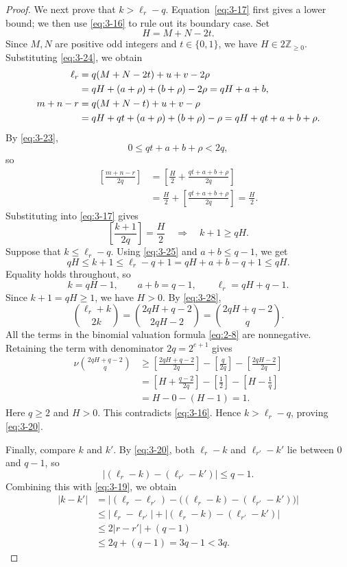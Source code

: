 \documentclass[11pt,a4paper]{article}
\numberwithin{equation}{section}
\theoremstyle{definition}
\begin{document}
\begin{proof}
We next prove that $k>\ell_r-q$. Equation~\eqref{eq:3-17} first gives a lower bound; we then use \eqref{eq:3-16} to rule out its boundary case. Set
\[
H=M+N-2t.
\]
Since $M,N$ are positive odd integers and $t\in\{0,1\}$, we have $H\in2\mathbb Z_{\ge0}$. Substituting \eqref{eq:3-24}, we obtain
\begin{align}
\ell_r&=q(M+N-2t)+u+v-2\rho\notag\\
&=qH+(a+\rho)+(b+\rho)-2\rho=qH+a+b,
\label{eq:3-25}\\
m+n-r&=q(M+N-t)+u+v-\rho\notag\\
&=qH+qt+(a+\rho)+(b+\rho)-\rho=qH+qt+a+b+\rho.
\label{eq:3-26}
\end{align}
By \eqref{eq:3-23},
\[
0\le qt+a+b+\rho<2q,
\]
so
\[
\begin{aligned}
\left[\frac{m+n-r}{2q}\right]
&=\left[\frac H2+\frac{qt+a+b+\rho}{2q}\right]\\
&=\frac H2+\left[\frac{qt+a+b+\rho}{2q}\right]=\frac H2.
\end{aligned}
\]
Substituting into \eqref{eq:3-17} gives
\begin{equation}
\left[\frac{k+1}{2q}\right]=\frac H2
\quad\Longrightarrow\quad k+1\ge qH.
\label{eq:3-27}
\end{equation}
Suppose that $k\le\ell_r-q$. Using \eqref{eq:3-25} and $a+b\le q-1$, we get
\[
qH\le k+1\le\ell_r-q+1=qH+a+b-q+1\le qH.
\]
Equality holds throughout, so
\begin{equation}
k=qH-1,\qquad a+b=q-1,\qquad\ell_r=qH+q-1.
\label{eq:3-28}
\end{equation}
Since $k+1=qH\ge1$, we have $H>0$. By \eqref{eq:3-28},
\begin{equation}
\binom{\ell_r+k}{2k}
=\binom{2qH+q-2}{2qH-2}
=\binom{2qH+q-2}{q}.
\label{eq:3-29}
\end{equation}
All the terms in the binomial valuation formula \eqref{eq:2-8} are nonnegative. Retaining the term with denominator $2q=2^{e+1}$ gives
\[
\begin{aligned}
\nu\binom{2qH+q-2}{q}
&\ge\left[\frac{2qH+q-2}{2q}\right]
-\left[\frac q{2q}\right]-\left[\frac{2qH-2}{2q}\right]\\
&=\left[H+\frac{q-2}{2q}\right]-\left[\frac12\right]-\left[H-\frac1q\right]\\
&=H-0-(H-1)=1.
\end{aligned}
\]
Here $q\ge2$ and $H>0$. This contradicts \eqref{eq:3-16}. Hence $k>\ell_r-q$, proving \eqref{eq:3-20}.

Finally, compare $k$ and $k'$. By \eqref{eq:3-20}, both $\ell_r-k$ and $\ell_{r'}-k'$ lie between $0$ and $q-1$, so
\[
\bigl|(\ell_r-k)-(\ell_{r'}-k')\bigr|\le q-1.
\]
Combining this with \eqref{eq:3-19}, we obtain
\[
\begin{aligned}
|k-k'|
&=\bigl|(\ell_r-\ell_{r'})-\bigl((\ell_r-k)-(\ell_{r'}-k')\bigr)\bigr|\\
&\le|\ell_r-\ell_{r'}|+\bigl|(\ell_r-k)-(\ell_{r'}-k')\bigr|\\
&\le2|r-r'|+(q-1)\\
&\le2q+(q-1)=3q-1<3q.
\end{aligned}
\]
\end{proof}
\end{document}
